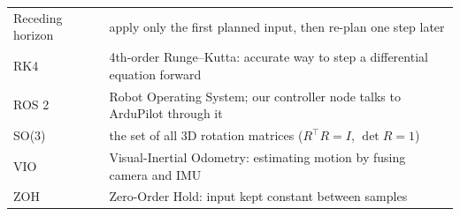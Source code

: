 \begin{center}
\begin{tabularx}{\linewidth}{@{}l X@{}}
Receding horizon & apply only the first planned input, then re-plan one step later\\
RK4 & 4th-order Runge--Kutta: accurate way to step a differential equation forward\\
ROS 2 & Robot Operating System; our controller node talks to ArduPilot through it\\
SO(3) & the set of all 3D rotation matrices ($R^\top R=I$, $\det R=1$)\\
VIO & Visual-Inertial Odometry: estimating motion by fusing camera and IMU\\
ZOH & Zero-Order Hold: input kept constant between samples\\
\bottomrule
\end{tabularx}
\end{center}
